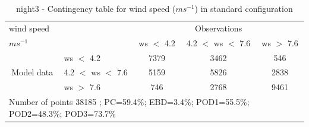 \begin{table}[h!]
\begin{center}
\begin{tabular}{llccc}
\hline
{wind speed}                                       &                                                    & \multicolumn{3}{c}{Observations}                 \\
{$m s^{-1}$}                                       &                             & ws $<$ 4.2   & 4.2 $<$ ws $<$ 7.6 & ws $>$ 7.6 \\
\hline
\multicolumn{1}{c}{\multirow{3}{*}{Model data}}  & ws $<$ 4.2             & 7379                & 3462                       & 546              \\
                                                 & 4.2  $<$ ws $<$ 7.6 & 5159                & 5826                       & 2838              \\
                                                 & ws $>$ 7.6             & 746                & 2768                       & 9461              \\
\hline 
\multicolumn{5}{l}{ Number of points        38185 ; PC=59.4\%; EBD=3.4\%; POD1=55.5\%; POD2=48.3\%; POD3=73.7\%}                 \\
\end{tabular}
\end{center}
\caption{night3 - Contingency table for {wind speed} ($m s^{-1}$) in standard configuration}
\label{tab:contingencywsBEF:night3}
\end{table}
